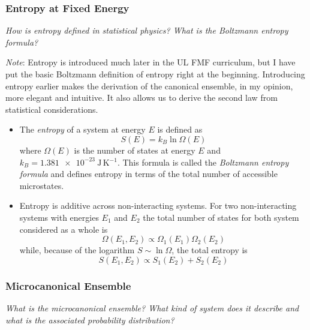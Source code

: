 \documentclass[11pt, a4paper]{article}
\begin{document}
\subsubsection{Entropy at Fixed Energy} \label{sss:entropy_fixed_E}
\textit{How is entropy defined in statistical physics? What is the Boltzmann entropy formula?}

\vspace{2mm}
\textit{Note}: Entropy is introduced much later in the UL FMF curriculum, but I have put the basic Boltzmann definition of entropy right at the beginning. Introducing entropy earlier makes the derivation of the canonical ensemble, in my opinion, more elegant and intuitive. It also allows us to derive the second law from statistical considerations.
\begin{itemize}
	\item The \textit{entropy} of a system at energy $ E $ is defined as
	\begin{equation*}
		S(E) = k_{B} \ln \Omega(E)
	\end{equation*}
	where $ \Omega(E) $ is the number of states at energy $ E $ and $ k_{B} = \SI{1.381e-23}{\joule \, \kelvin^{-1}} $. This formula is called the \textit{Boltzmann entropy formula} and defines entropy in terms of the total number of accessible microstates.
	
	\item Entropy is additive across non-interacting systems. For two non-interacting systems with energies $ E_{1} $ and $ E_{2} $ the total number of states for both system considered as a whole is 
	\begin{equation*}
		\Omega(E_{1}, E_{2}) \propto \Omega_{1}(E_{1})\Omega_{2}(E_{2})
	\end{equation*}
	while, because of the logarithm $ S \sim \ln \Omega $, the total entropy is
	\begin{equation*}
		S(E_{1}, E_{2}) \propto S_{1}(E_{2}) + S_{2}(E_{2})
	\end{equation*}
\end{itemize}

\subsubsection{Microcanonical Ensemble}
\textit{What is the microcanonical ensemble? What kind of system does it describe and what is the associated probability distribution?}
\end{document}
